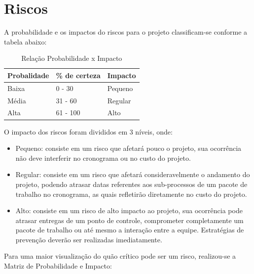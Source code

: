       \vfill
      \pagebreak

  \section{Riscos}

    A probabilidade e os impactos do riscos para o projeto classificam-se conforme a tabela abaixo:

  \begin{table}[!htbp]
    \begin{center}
    \caption{\label{probabilidadeximpacto}Relação Probabilidade x Impacto}
    \begin{tabular}{|l|l|l|}
    \hline
    \textbf{Probalidade} & \textbf{\% de certeza} & \textbf{Impacto} \\ \hline\hline
    Baixa                & 0 - 30                 & Pequeno          \\ \hline
    Média                & 31 - 60                & Regular          \\ \hline
    Alta                 & 61 - 100               & Alto             \\ \hline
    \end{tabular}
    \end{center}
  \end{table}

  O impacto dos riscos foram divididos em 3 níveis, onde:

  \begin{itemize}
    \item Pequeno: consiste em um risco que afetará pouco o projeto, sua ocorrência não deve interferir no cronograma ou no
    custo do projeto.
    \item Regular: consiste em um risco que afetará consideravelmente o andamento do projeto, podendo atrasar datas referentes
    aos sub-processos de um pacote de trabalho no cronograma, as quais refletirão diretamente no custo do projeto.
    \item Alto: consiste em um risco de alto impacto ao projeto, sua ocorrência pode atrasar entregas de um ponto de controle,
    comprometer completamente um pacote de trabalho ou até mesmo a interação entre a equipe. Estratégias de prevenção deverão
    ser realizadas imediatamente.
  \end{itemize}

  Para uma maior visualização do quão crítico pode ser um risco, realizou-se a Matriz de Probabilidade e Impacto:

